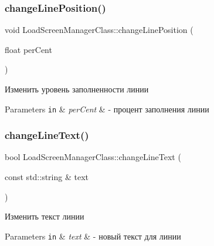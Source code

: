 \subsubsection{\texorpdfstring{change\+Line\+Position()}{changeLinePosition()}}
{\footnotesize\ttfamily void Load\+Screen\+Manager\+Class\+::change\+Line\+Position (\begin{DoxyParamCaption}\item[{float}]{per\+Cent }\end{DoxyParamCaption})\hspace{0.3cm}{\ttfamily [private]}}



Изменить уровень заполненности линии 


\begin{DoxyParams}[1]{Parameters}
\mbox{\tt in}  & {\em per\+Cent} & -\/ процент заполнения линии \\
\hline
\end{DoxyParams}
\mbox{\label{class_load_screen_manager_class_a48c99f2053eb880ee9550bda62cc01ad}} 
\subsubsection{\texorpdfstring{change\+Line\+Text()}{changeLineText()}}
{\footnotesize\ttfamily bool Load\+Screen\+Manager\+Class\+::change\+Line\+Text (\begin{DoxyParamCaption}\item[{const std\+::string \&}]{text }\end{DoxyParamCaption})\hspace{0.3cm}{\ttfamily [private]}}



Изменить текст линии 


\begin{DoxyParams}[1]{Parameters}
\mbox{\tt in}  & {\em text} & -\/ новый текст для линии \\
\hline
\end{DoxyParams}
\mbox{\label{class_load_screen_manager_class_a83f095d4673cc347f0a03f1608a88f88}} 
